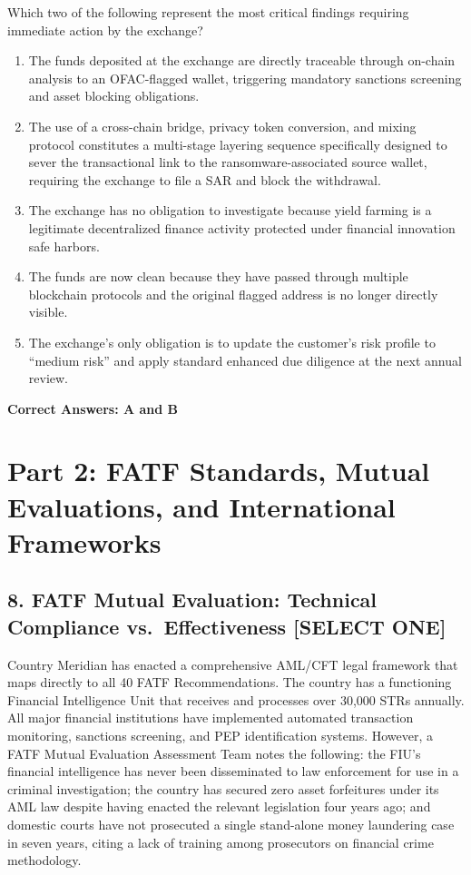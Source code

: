 \documentclass[11pt,a4paper]{article}
\begin{document}
	Which two of the following represent the most critical findings requiring immediate action by the exchange?
	
	\begin{enumerate}[label=\Alph*.]
		\item The funds deposited at the exchange are directly traceable through on-chain analysis to an OFAC-flagged wallet, triggering mandatory sanctions screening and asset blocking obligations.
		\item The use of a cross-chain bridge, privacy token conversion, and mixing protocol constitutes a multi-stage layering sequence specifically designed to sever the transactional link to the ransomware-associated source wallet, requiring the exchange to file a SAR and block the withdrawal.
		\item The exchange has no obligation to investigate because yield farming is a legitimate decentralized finance activity protected under financial innovation safe harbors.
		\item The funds are now clean because they have passed through multiple blockchain protocols and the original flagged address is no longer directly visible.
		\item The exchange's only obligation is to update the customer's risk profile to ``medium risk'' and apply standard enhanced due diligence at the next annual review.
	\end{enumerate}
	\textbf{Correct Answers: A and B}
	
	\section{Part 2: FATF Standards, Mutual Evaluations, and International Frameworks}
	
	\subsection{8. FATF Mutual Evaluation: Technical Compliance vs.\ Effectiveness \textnormal{[SELECT ONE]}}
	
	Country Meridian has enacted a comprehensive AML/CFT legal framework that maps directly to all 40 FATF Recommendations. The country has a functioning Financial Intelligence Unit that receives and processes over 30,000 STRs annually. All major financial institutions have implemented automated transaction monitoring, sanctions screening, and PEP identification systems. However, a FATF Mutual Evaluation Assessment Team notes the following: the FIU's financial intelligence has never been disseminated to law enforcement for use in a criminal investigation; the country has secured zero asset forfeitures under its AML law despite having enacted the relevant legislation four years ago; and domestic courts have not prosecuted a single stand-alone money laundering case in seven years, citing a lack of training among prosecutors on financial crime methodology.
	
\end{document}
